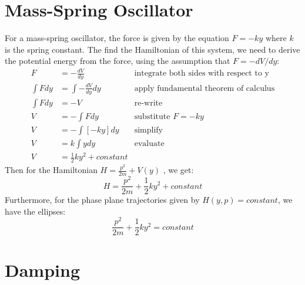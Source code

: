 \documentclass[12pt]{article}
\begin{document}
	\section{Mass-Spring Oscillator}
	
	\indent \indent For a mass-spring oscillator, the force is given by the equation $F=-ky$ where $k$ is the spring constant. The find the Hamiltonian of this system, we need to derive the potential energy from the force, using the assumption that $F=-dV/dy$:
	\begin{align*}
	F&=-\frac{dV}{dy} &\text{integrate both sides with respect to y}
	\\
	\int F dy &= \int -\frac{dV}{dy} dy &\text{apply fundamental theorem of calculus}
	\\
	\int F dy &= -V &\text{re-write}
	\\
	V&=-\int F dy &\text{substitute $F=-ky$}
	\\
	V&=-\int[-ky]dy &\text{simplify}
	\\
	V&=k\int y dy &\text{evaluate}
	\\
	V&=\frac{1}{2}ky^2 + constant
	\end{align*}
	\indent Then for the Hamiltonian $H=\frac{p^2}{2m}+V(y)$ , we get:
	\begin{equation*}
	H=\frac{p^2}{2m}+\frac{1}{2}ky^2 + constant
	\end{equation*}
	\indent Furthermore, for the phase plane trajectories given by $H(y,p)=constant$, we have the ellipses:
	\begin{equation*}
	\frac{p^2}{2m}+\frac{1}{2}ky^2=constant
	\end{equation*}
	
	\section{Damping}
	
\end{document}
